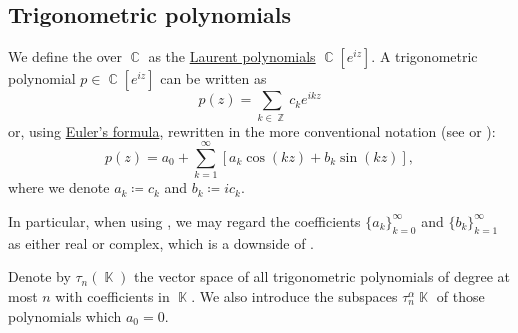 \subsection{Trigonometric polynomials}\label{subsec:trigonometric_polynomials}

\begin{definition}\label{def:trigonometric_polynomial}
  We define the  over \( \BbbC \) as the \hyperref[def:laurent_polynomial/polynomial]{Laurent polynomials} \( \BbbC[e^{iz}] \). A trigonometric polynomial \( p \in \BbbC[e^{iz}] \) can be written as
  \begin{equation}\label{def:trigonometric_polynomial/exponential}
    p(z) = \sum_{k \in \BbbZ} c_k e^{ikz}
  \end{equation}
  or, using \hyperref[thm:exponential_trigonometric_identities/eulers_formula]{Euler's formula}, rewritten in the more conventional notation (see \cite[1]{Боянов2008} or \cite[88]{Rudin1987}):
  \begin{equation}\label{def:trigonometric_polynomial/trigonometric}
    p(z) = a_0 + \sum_{k=1}^\infty [ a_k \cos(kz) + b_k \sin(kz) ],
  \end{equation}
  where we denote \( a_k \coloneqq c_k \) and \( b_k \coloneqq ic_k \).

  In particular, when using , we may regard the coefficients \( \{ a_k \}_{k=0}^\infty \) and \( \{ b_k \}_{k=1}^\infty \) as either real or complex, which is a downside of .

  Denote by \( \tau_n(\BbbK) \) the vector space of all trigonometric polynomials of degree at most \( n \) with coefficients in \( \BbbK \). We also introduce the subspaces \( \tau_n^\alpha{\BbbK} \) of those polynomials which \( a_0 = 0 \).
\end{definition}
